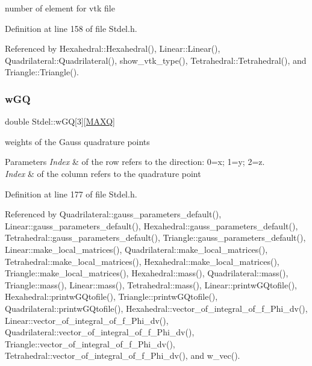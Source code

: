 number of element for vtk file 



Definition at line 158 of file Stdel.\+h.



Referenced by Hexahedral\+::\+Hexahedral(), Linear\+::\+Linear(), Quadrilateral\+::\+Quadrilateral(), show\+\_\+vtk\+\_\+type(), Tetrahedral\+::\+Tetrahedral(), and Triangle\+::\+Triangle().

\mbox{\label{classStdel_af99d72cbda49c30e23e83705c95a1c5b}} 
\subsubsection{\texorpdfstring{w\+GQ}{wGQ}}
{\footnotesize\ttfamily double Stdel\+::w\+GQ\mbox{[}3\mbox{]}\mbox{[}\hyperlink{MyOptions_8h_af708e94d886ba3f59582612949cac702}{M\+A\+XQ}\mbox{]}\hspace{0.3cm}{\ttfamily [protected]}}

weights of the Gauss quadrature points 
\begin{DoxyParams}{Parameters}
{\em Index} & of the row refers to the direction\+: 0=x; 1=y; 2=z. \\
\hline
{\em Index} & of the column refers to the quadrature point \\
\hline
\end{DoxyParams}


Definition at line 177 of file Stdel.\+h.



Referenced by Quadrilateral\+::gauss\+\_\+parameters\+\_\+default(), Linear\+::gauss\+\_\+parameters\+\_\+default(), Hexahedral\+::gauss\+\_\+parameters\+\_\+default(), Tetrahedral\+::gauss\+\_\+parameters\+\_\+default(), Triangle\+::gauss\+\_\+parameters\+\_\+default(), Linear\+::make\+\_\+local\+\_\+matrices(), Quadrilateral\+::make\+\_\+local\+\_\+matrices(), Tetrahedral\+::make\+\_\+local\+\_\+matrices(), Hexahedral\+::make\+\_\+local\+\_\+matrices(), Triangle\+::make\+\_\+local\+\_\+matrices(), Hexahedral\+::mass(), Quadrilateral\+::mass(), Triangle\+::mass(), Linear\+::mass(), Tetrahedral\+::mass(), Linear\+::printw\+G\+Qtofile(), Hexahedral\+::printw\+G\+Qtofile(), Triangle\+::printw\+G\+Qtofile(), Quadrilateral\+::printw\+G\+Qtofile(), Hexahedral\+::vector\+\_\+of\+\_\+integral\+\_\+of\+\_\+f\+\_\+\+Phi\+\_\+dv(), Linear\+::vector\+\_\+of\+\_\+integral\+\_\+of\+\_\+f\+\_\+\+Phi\+\_\+dv(), Quadrilateral\+::vector\+\_\+of\+\_\+integral\+\_\+of\+\_\+f\+\_\+\+Phi\+\_\+dv(), Triangle\+::vector\+\_\+of\+\_\+integral\+\_\+of\+\_\+f\+\_\+\+Phi\+\_\+dv(), Tetrahedral\+::vector\+\_\+of\+\_\+integral\+\_\+of\+\_\+f\+\_\+\+Phi\+\_\+dv(), and w\+\_\+vec().

